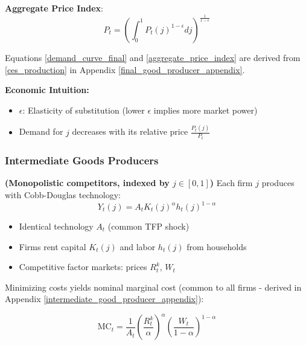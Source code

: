 \documentclass[11pt,preprint]{elsarticle}
\numberwithin{equation}{section}
\numberwithin{figure}{section}
\numberwithin{table}{section}
\def\tightlist{} %
\begin{document}
\textbf{Aggregate Price Index}:\\
\begin{equation}  
P_t = \left( \int_0^1 P_t(j)^{1-\epsilon}  dj \right)^{\frac{1}{1-\epsilon}}  
\label{aggregate_price_index}  
\end{equation}

Equations \ref{demand_curve_final} and \ref{aggregate_price_index} are
derived from \ref{ces_production} in Appendix
\ref{final_good_producer_appendix}.

\textbf{Economic Intuition:}

\begin{itemize}
\tightlist
\item
  \(\epsilon\): Elasticity of substitution (lower \(\epsilon\) implies
  more market power)
\item
  Demand for \(j\) decreases with its relative price
  \(\frac{P_t(j)}{P_t}\)
\end{itemize}

\subsubsection{Intermediate Goods
Producers}\label{intermediate-goods-producers}

\textbf{(Monopolistic competitors, indexed by \(j \in [0,1]\))} Each
firm \(j\) produces with Cobb-Douglas technology: \begin{equation}
Y_t(j) = A_t K_t(j)^{\alpha} h_t(j)^{1-\alpha}
\label{intermediate_production}
\end{equation}

\begin{itemize}
\tightlist
\item
  Identical technology \(A_t\) (common TFP shock)
\item
  Firms rent capital \(K_t(j)\) and labor \(h_t(j)\) from households
\item
  Competitive factor markets: prices \(R_t^k\), \(W_t\)
\end{itemize}

Minimizing costs yields nominal marginal cost (common to all firms -
derived in Appendix \ref{intermediate_good_producer_appendix}):

\begin{equation}
\text{MC}_t = \frac{1}{A_t} \left( \frac{R_t^k}{\alpha} \right)^{\alpha} \left( \frac{W_t}{1-\alpha} \right)^{1-\alpha}
\label{marginal_cost}
\end{equation}
\end{document}
